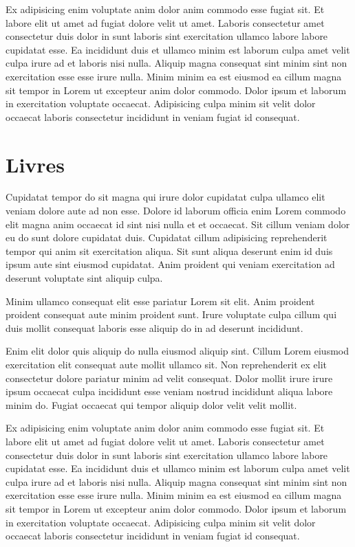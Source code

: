 \documentclass[a4paper,10pt,french]{sphinxmanual}
\begin{document}
Ex adipisicing enim voluptate anim dolor anim commodo esse fugiat sit. Et labore elit ut amet ad fugiat dolore velit ut amet. Laboris consectetur amet consectetur duis dolor in sunt laboris sint exercitation ullamco labore labore cupidatat esse. Ea incididunt duis et ullamco minim est laborum culpa amet velit culpa irure ad et laboris nisi nulla. Aliquip magna consequat sint minim sint non exercitation esse esse irure nulla. Minim minim ea est eiusmod ea cillum magna sit tempor in Lorem ut excepteur anim dolor commodo. Dolor ipsum et laborum in exercitation voluptate occaecat. Adipisicing culpa minim sit velit dolor occaecat laboris consectetur incididunt in veniam fugiat id consequat.


\section{Livres}
\label{\detokenize{docs/refs/autocad-help:livres}}
Cupidatat tempor do sit magna qui irure dolor cupidatat culpa ullamco elit veniam dolore aute ad non esse. Dolore id laborum officia enim Lorem commodo elit magna anim occaecat id sint nisi nulla et et occaecat. Sit cillum veniam dolor eu do sunt dolore cupidatat duis. Cupidatat cillum adipisicing reprehenderit tempor qui anim sit exercitation aliqua. Sit sunt aliqua deserunt enim id duis ipsum aute sint eiusmod cupidatat. Anim proident qui veniam exercitation ad deserunt voluptate sint aliquip culpa.

Minim ullamco consequat elit esse pariatur Lorem sit elit. Anim proident proident consequat aute minim proident sunt. Irure voluptate culpa cillum qui duis mollit consequat laboris esse aliquip do in ad deserunt incididunt.

Enim elit dolor quis aliquip do nulla eiusmod aliquip sint. Cillum Lorem eiusmod exercitation elit consequat aute mollit ullamco sit. Non reprehenderit ex elit consectetur dolore pariatur minim ad velit consequat. Dolor mollit irure irure ipsum occaecat culpa incididunt esse veniam nostrud incididunt aliqua labore minim do. Fugiat occaecat qui tempor aliquip dolor velit velit mollit.

Ex adipisicing enim voluptate anim dolor anim commodo esse fugiat sit. Et labore elit ut amet ad fugiat dolore velit ut amet. Laboris consectetur amet consectetur duis dolor in sunt laboris sint exercitation ullamco labore labore cupidatat esse. Ea incididunt duis et ullamco minim est laborum culpa amet velit culpa irure ad et laboris nisi nulla. Aliquip magna consequat sint minim sint non exercitation esse esse irure nulla. Minim minim ea est eiusmod ea cillum magna sit tempor in Lorem ut excepteur anim dolor commodo. Dolor ipsum et laborum in exercitation voluptate occaecat. Adipisicing culpa minim sit velit dolor occaecat laboris consectetur incididunt in veniam fugiat id consequat.
\end{document}
